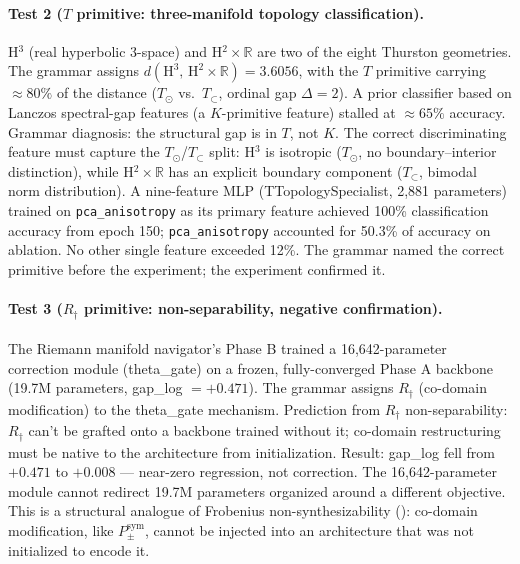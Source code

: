 \documentclass[12pt,a4paper]{article}
\newcommand{\Ppms}{P_{\pm}^{\text{sym}}}
\newcommand{\Tin}{T_{\mathord{\subset}}}
\begin{document}
\paragraph{Test 2 ($T$ primitive: three-manifold topology
classification).}
\label{par:thurston}
H$^3$ (real hyperbolic 3-space) and H$^2 \times \mathbb{R}$ are two
of the eight Thurston geometries. The grammar assigns
$d(\text{H}^3,\,\text{H}^2 \times \mathbb{R}) = 3.6056$, with the
$T$ primitive carrying $\approx 80\%$ of the distance ($T_\odot$
vs.\ $\Tin$, ordinal gap $\Delta = 2$). A prior classifier based on
Lanczos spectral-gap features (a $K$-primitive feature) stalled at
$\approx 65\%$ accuracy. Grammar diagnosis: the structural gap is in
$T$, not $K$. The correct discriminating feature must capture the
$T_\odot$/$\Tin$ split: H$^3$ is isotropic ($T_\odot$, no
boundary--interior distinction), while H$^2 \times \mathbb{R}$ has
an explicit boundary component ($\Tin$, bimodal norm distribution).
A nine-feature MLP (TTopologySpecialist, 2,881 parameters) trained
on \texttt{pca\_anisotropy} as its primary feature achieved 100\%
classification accuracy from epoch 150; \texttt{pca\_anisotropy}
accounted for 50.3\% of accuracy on ablation. No other single feature
exceeded 12\%. The grammar named the correct primitive before the
experiment; the experiment confirmed it.

\paragraph{Test 3 ($R_\dagger$ primitive: non-separability, negative
confirmation).}
The Riemann manifold navigator's Phase B trained a 16,642-parameter
correction module (theta\_gate) on a frozen, fully-converged Phase A
backbone (19.7M parameters, gap\_log $= +0.471$). The grammar assigns
$R_\dagger$ (co-domain modification) to the theta\_gate mechanism.
Prediction from $R_\dagger$ non-separability: $R_\dagger$ can't be
grafted onto a backbone trained without it; co-domain restructuring
must be native to the architecture from initialization. Result:
gap\_log fell from $+0.471$ to $+0.008$ --- near-zero regression,
not correction. The 16,642-parameter module cannot redirect 19.7M
parameters organized around a different objective. This is a
structural analogue of Frobenius non-synthesizability
(): co-domain modification, like $\Ppms$, cannot
be injected into an architecture that was not initialized to encode it.
\end{document}
